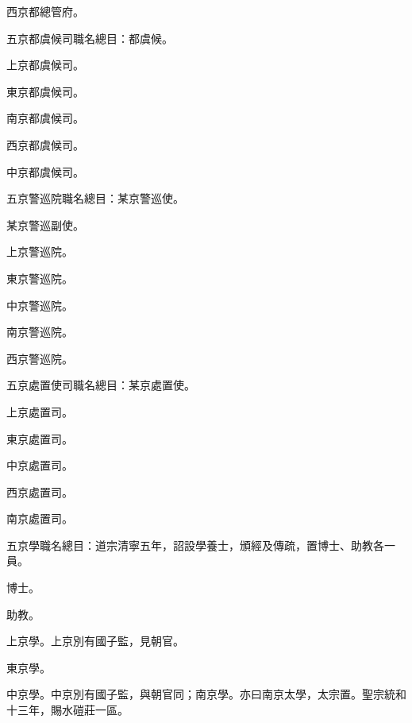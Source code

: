 \begin{pinyinscope}
 西京都總管府。



 五京都虞候司職名總目：都虞候。



 上京都虞候司。



 東京都虞候司。



 南京都虞候司。



 西京都虞候司。



 中京都虞候司。



 五京警巡院職名總目：某京警巡使。



 某京警巡副使。



 上京警巡院。



 東京警巡院。



 中京警巡院。



 南京警巡院。



 西京警巡院。



 五京處置使司職名總目：某京處置使。



 上京處置司。



 東京處置司。



 中京處置司。



 西京處置司。



 南京處置司。



 五京學職名總目：道宗清寧五年，詔設學養士，頒經及傳疏，置博士、助教各一員。



 博士。



 助教。



 上京學。上京別有國子監，見朝官。



 東京學。



 中京學。中京別有國子監，與朝官同；南京學。亦曰南京太學，太宗置。聖宗統和十三年，賜水磑莊一區。




\end{pinyinscope}
